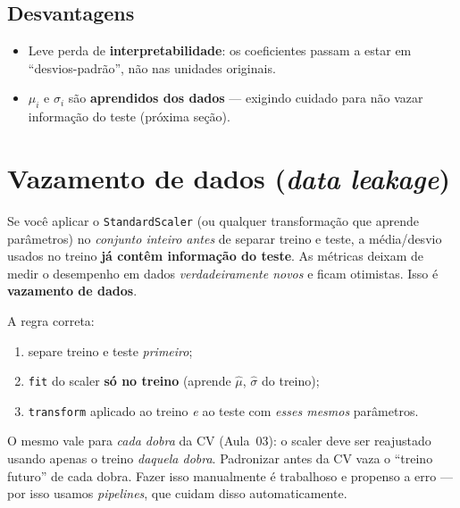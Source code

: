 \documentclass[11pt,a4paper]{article}
\begin{document}
\subsection{Desvantagens}
\begin{itemize}[leftmargin=1.4cm,nosep]
  \item Leve perda de \textbf{interpretabilidade}: os coeficientes passam a estar
        em ``desvios-padrão'', não nas unidades originais.
  \item $\mu_i$ e $\sigma_i$ são \textbf{aprendidos dos dados} --- exigindo
        cuidado para não vazar informação do teste (próxima seção).
\end{itemize}

\section{Vazamento de dados (\emph{data leakage})}
\begin{atencao}[A armadilha]
Se você aplicar o \texttt{StandardScaler} (ou qualquer transformação que aprende
parâmetros) no \emph{conjunto inteiro antes} de separar treino e teste, a
média/desvio usados no treino \textbf{já contêm informação do teste}. As métricas
deixam de medir o desempenho em dados \emph{verdadeiramente novos} e ficam
otimistas. Isso é \textbf{vazamento de dados}.
\end{atencao}

A regra correta:
\begin{enumerate}[leftmargin=1.6cm,nosep]
  \item separe treino e teste \emph{primeiro};
  \item \texttt{fit} do scaler \textbf{só no treino} (aprende $\widehat\mu$,
        $\widehat\sigma$ do treino);
  \item \texttt{transform} aplicado ao treino \emph{e} ao teste com \emph{esses
        mesmos} parâmetros.
\end{enumerate}

\begin{atencao}
O mesmo vale para \emph{cada dobra} da CV (Aula~03): o scaler deve ser reajustado
usando apenas o treino \emph{daquela dobra}. Padronizar antes da CV vaza o
``treino futuro'' de cada dobra. Fazer isso manualmente é trabalhoso e propenso a
erro --- por isso usamos \emph{pipelines}, que cuidam disso automaticamente.
\end{atencao}
\end{document}
